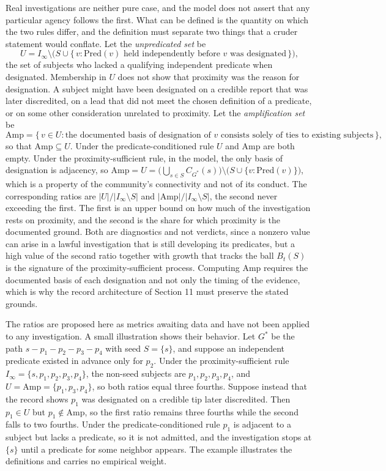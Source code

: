 \documentclass[11pt]{article}
\theoremstyle{definition}
\theoremstyle{remark}
\begin{document}
Real investigations are neither pure case, and the model does not assert that any particular agency follows the first. What can be defined is the quantity on which the two rules differ, and the definition must separate two things that a cruder statement would conflate. Let the \emph{unpredicated set} be
\[
U = I_\infty \setminus \bigl( S \cup \{\, v : \mathrm{Pred}(v) \text{ held independently before } v \text{ was designated} \,\} \bigr),
\]
the set of subjects who lacked a qualifying independent predicate when designated. Membership in $U$ does not show that proximity was the reason for designation. A subject might have been designated on a credible report that was later discredited, on a lead that did not meet the chosen definition of a predicate, or on some other consideration unrelated to proximity. Let the \emph{amplification set} be
\[
\mathrm{Amp} = \{\, v \in U : \text{the documented basis of designation of } v \text{ consists solely of ties to existing subjects} \,\},
\]
so that $\mathrm{Amp} \subseteq U$. Under the predicate-conditioned rule $U$ and $\mathrm{Amp}$ are both empty. Under the proximity-sufficient rule, in the model, the only basis of designation is adjacency, so $\mathrm{Amp} = U = \bigl(\bigcup_{s \in S} C_{G^{\ast}}(s)\bigr) \setminus \bigl(S \cup \{v : \mathrm{Pred}(v)\}\bigr)$, which is a property of the community's connectivity and not of its conduct. The corresponding ratios are $|U| / |I_\infty \setminus S|$ and $|\mathrm{Amp}| / |I_\infty \setminus S|$, the second never exceeding the first. The first is an upper bound on how much of the investigation rests on proximity, and the second is the share for which proximity is the documented ground. Both are diagnostics and not verdicts, since a nonzero value can arise in a lawful investigation that is still developing its predicates, but a high value of the second ratio together with growth that tracks the ball $B_t(S)$ is the signature of the proximity-sufficient process. Computing $\mathrm{Amp}$ requires the documented basis of each designation and not only the timing of the evidence, which is why the record architecture of Section 11 must preserve the stated grounds.

The ratios are proposed here as metrics awaiting data and have not been applied to any investigation. A small illustration shows their behavior. Let $G^{\ast}$ be the path $s - p_1 - p_2 - p_3 - p_4$ with seed $S = \{s\}$, and suppose an independent predicate existed in advance only for $p_2$. Under the proximity-sufficient rule $I_\infty = \{s,p_1,p_2,p_3,p_4\}$, the non-seed subjects are $p_1, p_2, p_3, p_4$, and $U = \mathrm{Amp} = \{p_1, p_3, p_4\}$, so both ratios equal three fourths. Suppose instead that the record shows $p_1$ was designated on a credible tip later discredited. Then $p_1 \in U$ but $p_1 \notin \mathrm{Amp}$, so the first ratio remains three fourths while the second falls to two fourths. Under the predicate-conditioned rule $p_1$ is adjacent to a subject but lacks a predicate, so it is not admitted, and the investigation stops at $\{s\}$ until a predicate for some neighbor appears. The example illustrates the definitions and carries no empirical weight.
\end{document}
